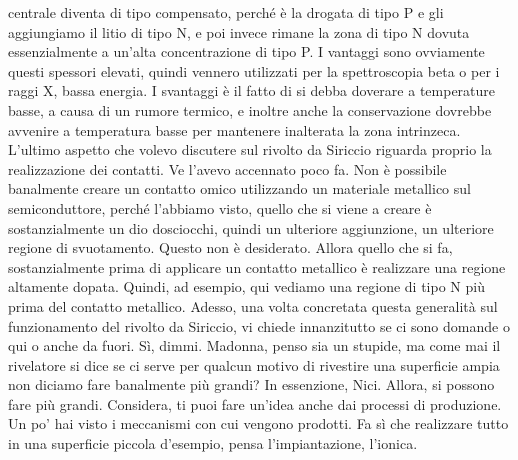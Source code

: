 centrale diventa di tipo compensato, perché è la drogata di tipo P e gli aggiungiamo il litio di tipo N, e poi invece rimane la zona di tipo N dovuta essenzialmente a un'alta concentrazione di tipo P. I vantaggi sono ovviamente questi spessori elevati, quindi vennero utilizzati per la spettroscopia beta o per i raggi X, bassa energia. I svantaggi è il fatto di si debba doverare a temperature basse, a causa di un rumore termico, e inoltre anche la conservazione dovrebbe avvenire a temperatura basse per mantenere inalterata la zona intrinzeca. L'ultimo aspetto che volevo discutere sul rivolto da Siriccio riguarda proprio la realizzazione dei contatti. Ve l'avevo accennato poco fa. Non è possibile banalmente creare un contatto omico utilizzando un materiale metallico sul semiconduttore, perché l'abbiamo visto, quello che si viene a creare è sostanzialmente un dio dosciocchi, quindi un ulteriore aggiunzione, un ulteriore regione di svuotamento. Questo non è desiderato. Allora quello che si fa, sostanzialmente prima di applicare un contatto metallico è realizzare una regione altamente dopata. Quindi, ad esempio, qui vediamo una regione di tipo N più prima del contatto metallico. Adesso, una volta concretata questa generalità sul funzionamento del rivolto da Siriccio, vi chiede innanzitutto se ci sono domande o qui o anche da fuori. Sì, dimmi. Madonna, penso sia un stupide, ma come mai il rivelatore si dice se ci serve per qualcun motivo di rivestire una superficie ampia non diciamo fare banalmente più grandi? In essenzione, Nici. Allora, si possono fare più grandi. Considera, ti puoi fare un'idea anche dai processi di produzione. Un po' hai visto i meccanismi con cui vengono prodotti. Fa sì che realizzare tutto in una superficie piccola d'esempio, pensa l'impiantazione, l'ionica.

